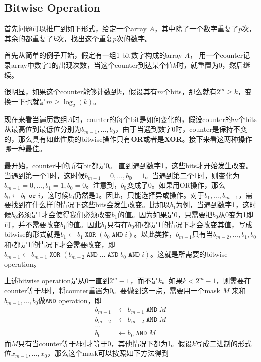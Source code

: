 \subsection{Bitwise Operation}
首先问题可以推广到如下形式，给定一个array $A$，其中除了一个数字重复了$p$次，其余的都重复了$k$次，找出这个重复$p$次的数字。
\par
首先从简单的例子开始，假定有一组1-bit数字构成的array $A$， 用一个counter记录array中数字1的出现次数，当这个counter到达某个值$k$时，就重置为0，然后继续。
\par
很明显，如果这个counter能够计数到$k$，假设其有$m$个bits，那么就有$2^m\geq k$，变换一下也就是$m\geq \log_{2}(k)$。
\par
现在来看当遍历数组$A$时，counter的每个bit是如何变化的，假设counter的$m$个bits从最高位到最低位分别为$b_{m-1}, \ldots, b_0$，由于当遇到数字0时，counter是保持不变的，那么具有如此性质的bitwise操作只有\textbf{OR}或者是\textbf{XOR}。接下来看这两种操作哪一种最佳。
\par
最开始，counter中的所有bit都是0。 直到遇到数字1，这些bits才开始发生改变。当遇到第一个1时，这时候$b_{m-1}=0,\ldots, b_0=1$。当遇到第二个1时，则变化为$b_{m-1}=0,\ldots, b_1=1, b_0=0$。注意到，$b_0$变成了0。如果用OR操作，那么$b_0\gets b_0\;\texttt{or}\; i$，这时候$b_0$仍然是1。因此，只能选择异或操作。对于$b_1,\ldots,b_{m-1}$，需要找到在什么样的情况下这些bits会发生改变。比如以$b_1$为例，当遇到数字1，这时候$b_0$必须是1才会使得我们必须改变$b_1$的值。因为如果是0，只需要把$b_0$从0变为1即可，并不需要改变$b_1$的值。因此$b_1$只有在$b_0$和$i$都是1的情况下才会改变其值，写成bitwise的形式就是$b_1\gets b_1\;\texttt{XOR}\;(b_0\;\texttt{AND}\;i)$。以此类推，$b_{m-1}$只有当$b_{m-2},\ldots,b_1,b_0$和$i$都是1的情况下才会需要改变，即$b_{m-1}\gets b_{m-1}\;\texttt{XOR}\;(b_{m-2}\;\texttt{AND}\;\ldots\;\texttt{AND}\;b_0\;\texttt{AND}\;i)$。这就是所需要的bitwise operation。
\par
上述bitwise operation是从0一直到$2^{m}-1$，而不是$k$。如果$k<2^m-1$，则需要在counter等于$k$时，将counter重置为0。要做到这一点，需要用一个mask $M$ 来和$b_{m-1},\ldots, b_0$做\texttt{AND} operation，即
\begin{align*}
b_{m-1}&\gets b_{m-1}\;\texttt{AND}\;M\\
b_{m-2}&\gets b_{m-2}\;\texttt{AND}\;M\\
\ldots& \\
b_0&\gets b_0\;\texttt{AND}\;M
\end{align*}
而$M$只有当counter等于$k$时才等于0，其他情况下都为1。假设$k$写成二进制的形式位$x_{m-1}, \ldots, x_{0}$，那么这个mask可以按照如下方法得到

